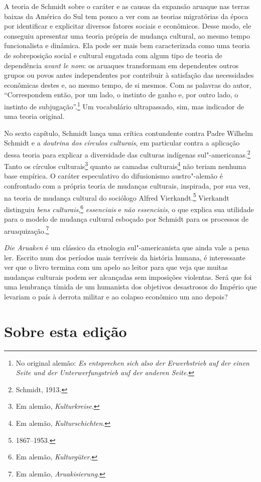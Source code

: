 A teoria de Schmidt sobre o caráter e as causas da expansão aruaque nas
terras baixas da América do Sul tem pouco a ver com as teorias
migratórias da época por identificar e explicitar diversos fatores
sociais e econômicos. Desse modo, ele conseguiu apresentar uma teoria
própria de mudança cultural, ao mesmo tempo funcionalista e dinâmica.
Ela pode ser mais bem caracterizada como uma teoria de sobreposição
social e cultural engatada com algum tipo de teoria de dependência
\textit{avant le nom}: os aruaques transformam em dependentes outros
grupos ou povos antes independentes por contribuir à satisfação das
necessidades econômicas destes e, ao mesmo tempo, de si mesmos. Com
as palavras do autor, ``Correspondem então, por um lado, o instinto de
ganho e, por outro lado, o instinto de subjugação''.\footnote{No original alemão: \textit{Es entsprechen sich also der Erwerbstrieb auf der einen Seite und der
Unterwerfungstrieb auf der anderen Seite}.} Um vocabulário
ultrapassado, sim, mas indicador de uma teoria original.

No sexto capítulo, Schmidt lança uma crítica contundente contra Padre Wilhelm
Schmidt e a \textit{doutrina dos círculos culturais}, em particular contra a
aplicação dessa teoria para explicar a diversidade das culturas
indígenas sul"-americanas.\footnote{Schmidt, 1913.} Tanto os círculos culturais\footnote{Em alemão, \textit{Kulturkreise}.} quanto as camadas culturais\footnote{Em alemão, \textit{Kulturschichten}.} não teriam nenhuma base empírica. O caráter
especulativo do difusionismo austro"-alemão é confrontado com a própria
teoria de mudanças culturais, inspirada, por sua vez, na teoria de
mudança cultural do sociólogo Alfred Vierkandt.\footnote{1867--1953.} Vierkandt distinguiu \textit{bens culturais},\footnote{Em alemão, \textit{Kulturgüter}.} \textit{essenciais} e \textit{não essenciais}, o que explica
sua utilidade para o modelo de mudança cultural esboçado por Schmidt
para os processos de {aruaquização}.\footnote{Em alemão, \textit{Aruakisierung}.}

\textit{Die Aruaken} é um clássico da etnologia sul"-americanista que ainda
vale a pena ler. Escrito num dos períodos mais terríveis da história
humana, é interessante ver que o livro termina com um apelo ao leitor
para que veja que muitas mudanças culturais podem ser alcançadas sem
imposições violentas. Será que foi uma lembrança tímida de um humanista
dos objetivos desastrosos do Império que levariam o país à derrota
militar e ao colapso econômico um ano depois?

\section{Sobre esta edição}

